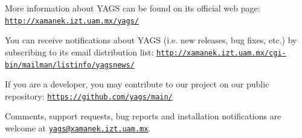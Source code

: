 \documentclass[a4paper,11pt]{report}
\begin{document}
{{More information about \textsf{YAGS} can be found on its official web page: \href{http://xamanek.izt.uam.mx/yags/} {\texttt{http://xamanek.izt.uam.mx/yags/}} 

You can receive notifications about \textsf{YAGS} (i.e. new releases, bug fixes, etc.) by subscribing to its email distribution
list: \href{http://xamanek.izt.uam.mx/cgi-bin/mailman/listinfo/yagsnews/} {\texttt{http://xamanek.izt.uam.mx/cgi-bin/mailman/listinfo/yagsnews/}} 

If you are a developer, you may contribute to our project on our public
repository: \href{https://github.com/yags/main/} {\texttt{https://github.com/yags/main/}} 

Comments, support requests, bug reports and installation notifications are
welcome at \href{mailto://yags@xamanek.izt.uam.mx} {\texttt{yags@xamanek.izt.uam.mx}}. }

 }

 
\end{document}
